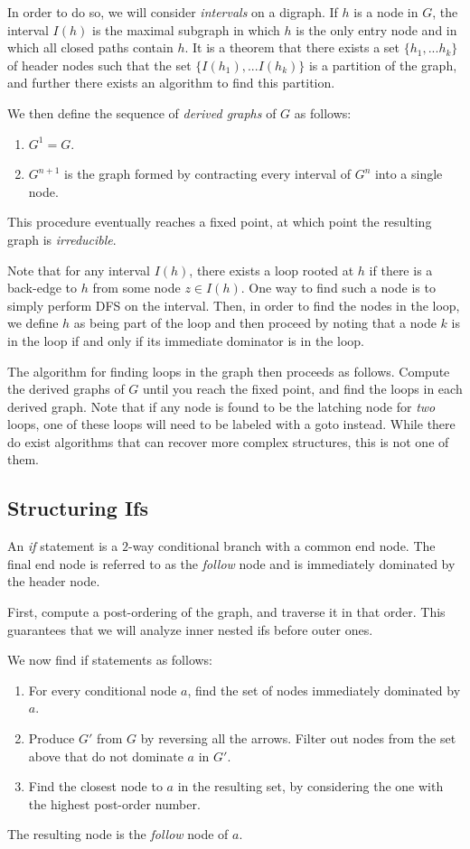 \documentclass{article}
\begin{document}
In order to do so, we will consider {\em intervals} on a digraph. If $h$ is a node in $G$,
the interval $I(h)$ is the maximal subgraph in which $h$ is the only entry node and 
in which all closed paths contain $h$. It is a theorem that there exists a set 
$\{h_1, ... h_k\}$ of header nodes such that the set $\{ I(h_1), ... I(h_k) \}$ is
a partition of the graph, and further there exists an algorithm to find this partition.

We then define the sequence of {\em derived graphs} of $G$ as follows:
\begin{enumerate}
\item $G^1 = G$.
\item $G^{n+1}$ is the graph formed by contracting every interval of $G^n$ into a single node.
\end{enumerate}
This procedure eventually reaches a fixed point, at which point the resulting graph is
{\em irreducible}.

Note that for any interval $I(h)$, there exists a loop rooted at $h$ if there is a back-edge
to $h$ from some node $z \in I(h)$. One way to find such a node is to simply perform DFS
on the interval. Then, in order to find the nodes in the loop, we define $h$ as being part of
the loop and then proceed by noting that a node $k$ is in the loop if and only if its immediate
dominator is in the loop.

The algorithm for finding loops in the graph then proceeds as follows.
Compute the derived graphs of $G$ until you reach the fixed point, and find the loops in each
derived graph. Note that if any node is found to be the latching node for {\em two} loops,
one of these loops will need to be labeled with a goto instead. While there do exist algorithms
that can recover more complex structures, this is not one of them.
\subsection{Structuring Ifs}
An {\em if} statement is a $2$-way conditional branch with a common end node. 
The final end node is referred to as the {\em follow} node and is immediately dominated
by the header node.

First, compute a post-ordering of the graph, and traverse it in that order. This guarantees
that we will analyze inner nested ifs before outer ones.

We now find if statements as follows:
\begin{enumerate}
\item For every conditional node $a$,
find the set of nodes immediately dominated by $a$.
\item Produce $G'$ from $G$ by
reversing all the arrows. Filter out nodes from the set above that do 
not dominate $a$ in $G'$.
\item Find the closest node to $a$ 
in the resulting set, by considering
the one with the highest post-order
number.
\end{enumerate}
The resulting node is the {\em follow} node of $a$.
\end{document}
